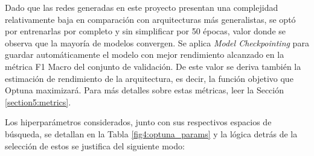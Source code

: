 Dado que las redes generadas en este proyecto presentan una complejidad relativamente baja en comparación con arquitecturas más generalistas, se optó por entrenarlas por completo y sin simplificar por 50 épocas, valor donde se observa que la mayoría de modelos convergen. Se aplica \textit{Model Checkpointing} para guardar automáticamente el modelo con mejor rendimiento alcanzado en la métrica F1 Macro del conjunto de validación. De este valor se deriva también la estimación de rendimiento de la arquitectura, es decir, la función objetivo que Optuna maximizará. Para más detalles sobre estas métricas, leer la Sección  \ref{section5:metrics}.

Los hiperparámetros considerados, junto con sus respectivos espacios de búsqueda, se detallan en la Tabla \ref{fig4:optuna_params} y la lógica detrás de la selección de estos se justifica del siguiente modo:

